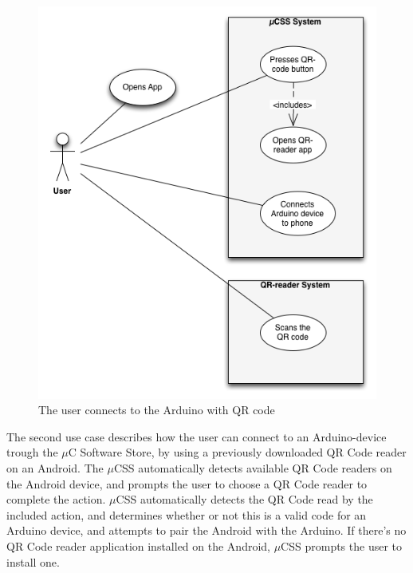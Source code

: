 \begin{figure}[H]
\centering
\includegraphics[scale=0.7]{images/UseCase2}
\caption[Use case 2]{The user connects to the Arduino with QR code}
\end{figure}

The second use case describes how the user can connect to an Arduino-device trough the $\mu$C Software Store, by using a previously downloaded QR Code reader on an Android. The $\mu$CSS automatically detects available QR Code readers on the Android device, and prompts the user to choose a QR Code reader to complete the action. $\mu$CSS automatically detects the QR Code read by the included action, and determines whether or not this is a valid code for an Arduino device, and attempts to pair the Android with the Arduino. If there's no QR Code reader application installed on the Android, $\mu$CSS prompts the user to install one.

